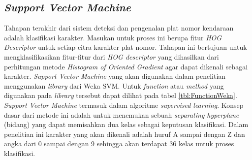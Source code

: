\subsection{\textit{Support Vector Machine}}
\noindent Tahapan terakhir dari sistem deteksi dan pengenalan plat nomor kendaraan adalah klasifikasi karakter. Masukan untuk proses ini berupa fitur \textit{HOG Descriptor} untuk setiap citra karakter plat nomor. Tahapan ini bertujuan untuk mengklasifikasikan fitur-fitur dari \textit{HOG descriptor} yang dihasilkan dari perhitungan metode \textit{Histogram of Oriented Gradient} agar dapat dikenali sebagai karakter. \textit{Support Vector Machine} yang akan digunakan dalam penelitian menggunakan \textit{library} dari Weka SVM. Untuk \textit{function} atau \textit{method} yang digunakan pada \textit{library} tersebut dapat dilihat pada tabel \ref{tbl:FunctionWeka}. \textit{Support Vector Machine} termasuk dalam algoritme \textit{supervised learning}. Konsep dasar dari metode ini adalah untuk menemukan sebuah \textit{separating hyperplane} (bidang) yang dapat memisahkan dua kelas sebagai keputusan klasifikasi. Dalam penelitian ini karakter yang akan dikenali adalah huruf A sampai dengan Z dan angka dari 0 sampai dengan 9 sehingga akan terdapat 36 kelas untuk proses klasifikasi.



\newpage